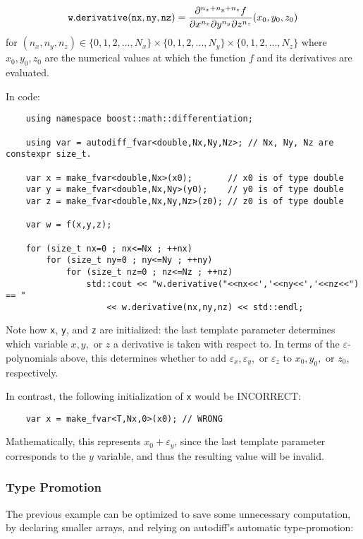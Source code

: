 \documentclass{article}
\begin{document}
\[
{\tt w.derivative(nx,ny,nz)} =
    \frac{\partial^{n_x+n_y+n_z}f}{\partial x^{n_x}\partial y^{n_y}\partial z^{n_z} }(x_0,y_0,z_0)
\]
for $(n_x,n_y,n_z)\in\{0,1,2,...,N_x\}\times\{0,1,2,...,N_y\}\times\{0,1,2,...,N_z\}$ where $x_0, y_0, z_0$ are
the numerical values at which the function $f$ and its derivatives are evaluated.

In code:
\begin{verbatim}
    using namespace boost::math::differentiation;

    using var = autodiff_fvar<double,Nx,Ny,Nz>; // Nx, Ny, Nz are constexpr size_t.

    var x = make_fvar<double,Nx>(x0);       // x0 is of type double
    var y = make_fvar<double,Nx,Ny>(y0);    // y0 is of type double
    var z = make_fvar<double,Nx,Ny,Nz>(z0); // z0 is of type double

    var w = f(x,y,z);

    for (size_t nx=0 ; nx<=Nx ; ++nx)
        for (size_t ny=0 ; ny<=Ny ; ++ny)
            for (size_t nz=0 ; nz<=Nz ; ++nz)
                std::cout << "w.derivative("<<nx<<','<<ny<<','<<nz<<") == "
                    << w.derivative(nx,ny,nz) << std::endl;
\end{verbatim}
Note how {\tt x}, {\tt y}, and {\tt z} are initialized: the last template parameter determines which variable
$x, y,$ or $z$ a derivative is taken with respect to. In terms of the $\varepsilon$-polynomials
above, this determines whether to add $\varepsilon_x, \varepsilon_y,$ or $\varepsilon_z$ to
$x_0, y_0,$ or $z_0$, respectively.

In contrast, the following initialization of {\tt x} would be INCORRECT:

\begin{verbatim}
    var x = make_fvar<T,Nx,0>(x0); // WRONG
\end{verbatim}
Mathematically, this represents $x_0+\varepsilon_y$, since the last template parameter corresponds to the
$y$ variable, and thus the resulting value will be invalid.

\subsubsection{Type Promotion}

The previous example can be optimized to save some unnecessary computation, by declaring smaller arrays,
and relying on autodiff's automatic type-promotion:
\end{document}

